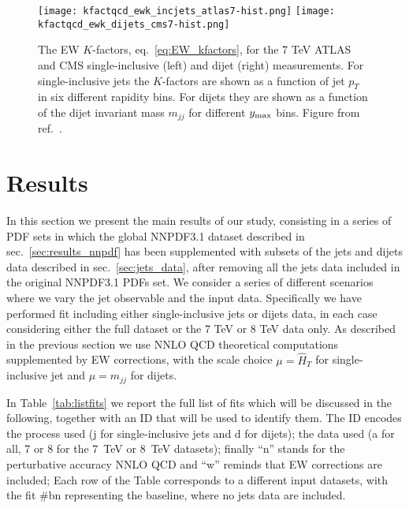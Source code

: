\begin{figure}[!t]
    \centering
    \texttt{[image: kfactqcd\_ewk\_incjets\_atlas7-hist.png]}
    \texttt{[image: kfactqcd\_ewk\_dijets\_cms7-hist.png]}\\
    \caption{The EW $K$-factors, eq.~\eqref{eq:EW_kfactors}, for the 7 TeV ATLAS and CMS
       single-inclusive (left) and dijet (right)  measurements. For 
       single-inclusive jets the $K$-factors are shown as a function of jet $p_T$ 
       in six different rapidity bins. For dijets they are shown as a function of 
       the dijet invariant mass $m_{jj}$ for different $y_{\rm max}$ bins. Figure from ref.~\cite{AbdulKhalek:2020jut}.}
    \label{fig:kfactewk_dijets7}
\end{figure}





\section{Results}
\label{sec:jets_res}
In this section we present the main results of our study, consisting in a series of PDF sets
in which the global NNPDF3.1 dataset described in sec.~\ref{sec:results_nnpdf} has been supplemented with
subsets of the jets and dijets data described in sec.~\ref{sec:jets_data}, after removing all the jets data included in
the original NNPDF3.1 PDFs set.
We consider a series of different scenarios where we vary the jet observable and the input data. 
Specifically we have performed fit including either single-inclusive jets or dijets data, in each case considering
either the full dataset or the 7 TeV or 8 TeV data only. 
As described in the previous section we use NNLO QCD theoretical computations supplemented by EW corrections, 
with the scale choice $\mu = \hat{H}_T$ for single-inclusive jet and $\mu = m_{jj}$ for dijets.

%
In Table~\ref{tab:listfits} we report the full list of fits which will be discussed in the following, together 
with an ID that will be used to identify them.
The ID encodes the process used (j for single-inclusive
jets and d for dijets); the data used (a for all, 7 or 8 for the
7~TeV or 8~TeV datasets); 
finally ``n'' stands for the perturbative accuracy NNLO QCD and ``w'' reminds that EW corrections are included;
Each row of the Table corresponds to a different input datasets, with the fit \#bn representing the baseline, where no jets
data are included. 

